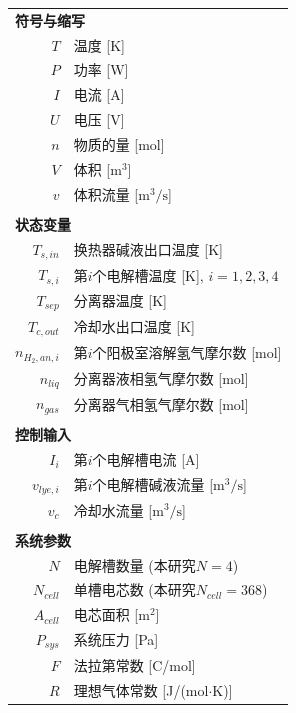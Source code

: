 
\begin{nomenclature}

\begin{longtable}{r l}
  \multicolumn{2}{l}{\textbf{符号与缩写}} \\[0.5em]

  $T$ & 温度 [K] \\
  $P$ & 功率 [W] \\
  $I$ & 电流 [A] \\
  $U$ & 电压 [V] \\
  $n$ & 物质的量 [mol] \\
  $V$ & 体积 [$\mathrm{m}^3$] \\
  $v$ & 体积流量 [$\mathrm{m}^3/\mathrm{s}$] \\

  \multicolumn{2}{l}{} \\[-0.3em]
  \multicolumn{2}{l}{\textbf{状态变量}} \\[0.3em]
  $T_{s,in}$ & 换热器碱液出口温度 [K] \\
  $T_{s,i}$ & 第$i$个电解槽温度 [K], $i=1,2,3,4$ \\
  $T_{sep}$ & 分离器温度 [K] \\
  $T_{c,out}$ & 冷却水出口温度 [K] \\
  $n_{H_2,an,i}$ & 第$i$个阳极室溶解氢气摩尔数 [mol] \\
  $n_{liq}$ & 分离器液相氢气摩尔数 [mol] \\
  $n_{gas}$ & 分离器气相氢气摩尔数 [mol] \\

  \multicolumn{2}{l}{} \\[-0.3em]
  \multicolumn{2}{l}{\textbf{控制输入}} \\[0.3em]
  $I_i$ & 第$i$个电解槽电流 [A] \\
  $v_{lye,i}$ & 第$i$个电解槽碱液流量 [$\mathrm{m}^3/\mathrm{s}$] \\
  $v_c$ & 冷却水流量 [$\mathrm{m}^3/\mathrm{s}$] \\

  \multicolumn{2}{l}{} \\[-0.3em]
  \multicolumn{2}{l}{\textbf{系统参数}} \\[0.3em]
  $N$ & 电解槽数量 (本研究$N=4$) \\
  $N_{cell}$ & 单槽电芯数 (本研究$N_{cell}=368$) \\
  $A_{cell}$ & 电芯面积 [$\mathrm{m}^2$] \\
  $P_{sys}$ & 系统压力 [Pa] \\
  $F$ & 法拉第常数 [C/mol] \\
  $R$ & 理想气体常数 [J/(mol$\cdot$K)] \\


\end{longtable}
\end{nomenclature}
